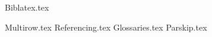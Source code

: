 {Biblatex.tex}
\usepackage[letterpaper, margin=2cm,includefoot,footskip=30pt]{geometry}
\usepackage[spanish, english]{babel}
\usepackage{amsmath}
\usepackage{amsthm}
\usepackage{amssymb}
\usepackage{csquotes}
\usepackage{expl3}
\usepackage{fontspec}
\usepackage{graphicx}
\usepackage{keyval}
\usepackage{tabulary}
\usepackage{url}
\usepackage{xparse}
\usepackage{blindtext}
\usepackage{datetime2}
\usepackage{float}
\usepackage{algorithm}
\usepackage{algpseudocode}
\usepackage{kbordermatrix}
{Multirow.tex}
{Referencing.tex}
{Glossaries.tex}
{Parskip.tex}

